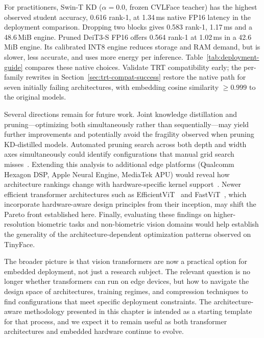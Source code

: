 \documentclass[runningheads,a4paper]{llncs}
\begin{document}
For practitioners, Swin-T KD ($\alpha{=}0.0$, frozen CVLFace teacher) has the highest observed student accuracy, 0.616 rank-1, at 1.34\,ms native FP16 latency in the deployment comparison. Dropping two blocks gives 0.583 rank-1, 1.17\,ms and a 48.6\,MiB engine. Pruned DeiT3-S FP16 offers 0.564 rank-1 at 1.02\,ms in a 42.6\,MiB engine. Its calibrated INT8 engine reduces storage and RAM demand, but is slower, less accurate, and uses more energy per inference. Table~\ref{tab:deployment-guide} compares these native choices. Validate TRT compatibility early; the per-family rewrites in Section~\ref{sec:trt-compat-success} restore the native path for seven initially failing architectures, with embedding cosine similarity $\geq 0.999$ to the original models.

Several directions remain for future work. Joint knowledge distillation and pruning---optimizing both simultaneously rather than sequentially---may yield further improvements and potentially avoid the fragility observed when pruning KD-distilled models. Automated pruning search across both depth and width axes simultaneously could identify configurations that manual grid search misses~\cite{Park2023PTPrune}. Extending this analysis to additional edge platforms (Qualcomm Hexagon DSP, Apple Neural Engine, MediaTek APU) would reveal how architecture rankings change with hardware-specific kernel support~\cite{Ngo2025EdgeInference}. Newer efficient transformer architectures such as EfficientViT~\cite{liu2023efficientvit} and FastViT~\cite{vasu2023fastvit}, which incorporate hardware-aware design principles from their inception, may shift the Pareto front established here. Finally, evaluating these findings on higher-resolution biometric tasks and non-biometric vision domains would help establish the generality of the architecture-dependent optimization patterns observed on TinyFace.

The broader picture is that vision transformers are now a practical option for embedded deployment, not just a research subject. The relevant question is no longer whether transformers can run on edge devices, but how to navigate the design space of architectures, training regimes, and compression techniques to find configurations that meet specific deployment constraints. The architecture-aware methodology presented in this chapter is intended as a starting template for that process, and we expect it to remain useful as both transformer architectures and embedded hardware continue to evolve.


\end{document}
